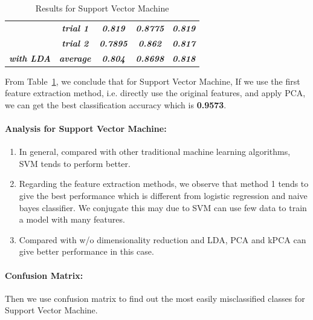 \documentclass{article}
\begin{document}
\begin{table}[!htb]
\begin{tabular}{|c|c|ccc|}
                                                                                                & \textit{\textbf{trial 1}} & \multicolumn{1}{c|}{\textit{\textbf{0.819}}}                         & \multicolumn{1}{c|}{\textit{\textbf{0.8775}}} & \textit{\textbf{0.819}}  \\ \cline{2-5} 
                                                                                                & \textit{\textbf{trial 2}} & \multicolumn{1}{c|}{\textit{\textbf{0.7895}}}                        & \multicolumn{1}{c|}{\textit{\textbf{0.862}}}  & \textit{\textbf{0.817}}  \\ \cline{2-5} 
\multirow{-3}{*}{\textit{\textbf{with LDA}}}                                                    & \textit{\textbf{average}} & \multicolumn{1}{c|}{\textit{\textbf{0.804}}}                         & \multicolumn{1}{c|}{\textit{\textbf{0.8698}}} & \textit{\textbf{0.818}}  \\ \hline
\end{tabular}
\caption{Results for Support Vector Machine}
\label{SVM_res}
\end{table}

From Table~\ref{SVM_res}, we conclude that for Support Vector Machine, If we use the first feature extraction method, i.e. directly use the original features, and apply PCA, we can get the best classification accuracy which is \textbf{0.9573}.

\paragraph{Analysis for Support Vector Machine:}

\begin{enumerate}
    \item In general, compared with other traditional machine learning algorithms, SVM tends to perform better.
    \item Regarding the feature extraction methods, we observe that method 1 tends to give the best performance which is different from logistic regression and naive bayes classifier. We conjugate this may due to SVM can use few data to train a model with many features.
    \item Compared with w/o dimensionality reduction and LDA, PCA and kPCA can give better performance in this case.
\end{enumerate}

\paragraph{Confusion Matrix:}
Then we use confusion matrix to find out the most easily misclassified classes for Support Vector Machine.
\end{document}
